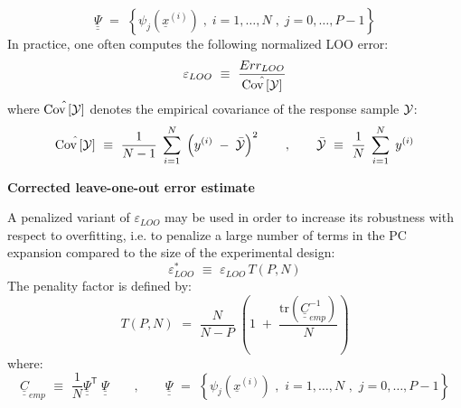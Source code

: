 {  \begin{equation} \label{eq:4.3:7bis}
    \underline{\underline{\Psi}} \, \, = \, \, \left\{ \psi_{j}(\underline{x}^{(i)}) \; , \; i=1,\dots,N \; , \; j = 0,\dots,P-1 \right\}
  \end{equation}
  In practice, one often computes the following normalized LOO error:
  \begin{equation} \label{eq:4.3:8bis}
    \varepsilon_{LOO} \, \, \equiv \, \, \frac{Err_{LOO}}{\hat{{\rm Cov}\left[ {\mathcal Y} \right]}}
  \end{equation}
  where $\hat{{\rm Cov}\left[ \mathcal{Y} \right]}$ denotes the empirical covariance of the response sample ${\mathcal Y}$:
  \begin{equation} \label{eq:4.3:4bis}
    \hat{{\rm Cov}\left[ \mathcal{Y} \right]} \, \, \equiv \, \, \frac{1}{N-1} \; \sum_{i=1}^{N} \; \left( y^{(i)} \; - \;   \bar{\mathcal{Y}}  \right)^{2} \quad  \quad , \quad \quad   \bar{\mathcal{Y}} \, \, \equiv \, \, \frac{1}{N} \; \sum_{i=1}^{N} \; y^{(i)}
  \end{equation}

  \textbf{Corrected leave-one-out error estimate} \vspace{2mm}

  A penalized variant of $\varepsilon_{LOO}$ may be used in order to increase its robustness with respect to overfitting, i.e. to penalize a large number of terms in the PC expansion compared to the size of the experimental design:
  \begin{equation}
    \varepsilon_{LOO}^{*} \, \, \equiv \, \, \varepsilon_{LOO} \, T(P,N)
  \end{equation}
  The penality factor is defined by:
  \begin{equation}
    T(P,N) \, \, = \, \,   \frac{N}{N-P}  \; \left(1 \; + \; \frac{\mbox{tr} \left( \underline{\underline{C}}_{emp}^{-1}  \right) }{N} \right)
  \end{equation}
  where:
  \begin{equation} \label{eq:4.3:10bis}
    \underline{\underline{C}}_{emp} \, \, \equiv \, \, \frac{1}{N}\underline{\underline{\Psi}}^{\textsf{T}}\; \underline{\underline{\Psi}} \quad \quad , \quad \quad
    \underline{\underline{\Psi}} \, \, = \, \, \left\{ \psi_{j}(\underline{x}^{(i)}) \, \, , \, \, i=1,\dots,N \, \, , \, \, j=0,\dots,P-1 \right\}
  \end{equation}
}
{}

